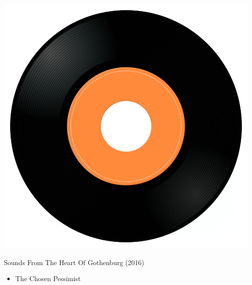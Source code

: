 \begin{minipage}[t]{0.25\textwidth}\vspace{0pt}
\captionsetup{type=figure}
\includegraphics[width=\textwidth]{Images/cover.png}
\caption*{Sounds From The Heart Of Gothenburg (2016)}
\end{minipage}
\begin{minipage}[t]{0.25\textwidth}\vspace{0pt}
\begin{itemize}[nosep,leftmargin=1em,labelwidth=*,align=left]
	\setlength{\itemsep}{0pt}
	\item The Chosen Pessimist
\end{itemize}
\end{minipage}
